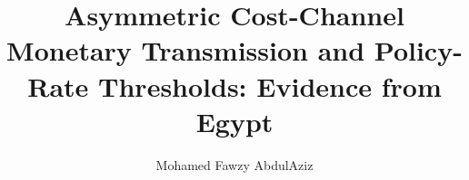 \documentclass[review,12pt]{elsarticle}
\begin{document}
\begin{frontmatter}

\title{Asymmetric Cost-Channel Monetary Transmission and Policy-Rate Thresholds: Evidence from Egypt}

\author[idsc,cu]{Mohamed Fawzy AbdulAziz}


\address[idsc]{Information and Decision Support Center (IDSC), The Egyptian Cabinet, Cairo, Egypt}
\address[cu]{Department of Economics, Faculty of Economics and Political Science, Cairo University, Giza, Egypt}


\end{frontmatter}
\end{document}
